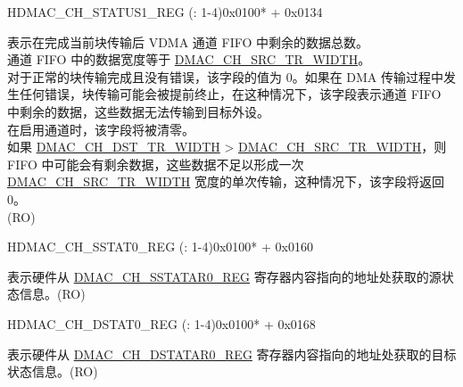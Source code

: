 \begin{register}{H}{DMAC\_CH\_STATUS1\_REG (: 1-4)}{0x0100* + 0x0134}\label{regdesc:DMACCHNSTATUS1REG}
%
%
\regnewline%
\begin{regdesc}\begin{reglist}
\label{fielddesc:DMACCHNDATALEFTINFIFO}\item [DMAC\_CH\regindex{n}\_DATA\_LEFT\_IN\_FIFO] 
表示在完成当前块传输后 VDMA 通道 FIFO 中剩余的数据总数。 \\
通道 FIFO 中的数据宽度等于 \hyperref[fielddesc:DMACCHNSRCTRWIDTH]{DMAC\_CH\_SRC\_TR\_WIDTH}。 \\
对于正常的块传输完成且没有错误，该字段的值为 0。如果在 DMA 传输过程中发生任何错误，块传输可能会被提前终止，在这种情况下，该字段表示通道 FIFO 中剩余的数据，这些数据无法传输到目标外设。\\
在启用通道时，该字段将被清零。\\
如果 \hyperref[fielddesc:DMACCHNDSTTRWIDTH]{DMAC\_CH\_DST\_TR\_WIDTH} > \hyperref[fielddesc:DMACCHNSRCTRWIDTH]{DMAC\_CH\_SRC\_TR\_WIDTH}，则 FIFO 中可能会有剩余数据，这些数据不足以形成一次 \hyperref[fielddesc:DMACCHNSRCTRWIDTH]{DMAC\_CH\_SRC\_TR\_WIDTH} 宽度的单次传输，这种情况下，该字段将返回 0。\\
(RO)
\end{reglist}\end{regdesc}
\end{register}


\begin{register}{H}{DMAC\_CH\_SSTAT0\_REG (: 1-4)}{0x0100* + 0x0160}\label{regdesc:DMACCHNSSTAT0REG}
%
\regnewline%
\begin{regdesc}\begin{reglist}
\label{fielddesc:DMACCHNSSTAT}\item [DMAC\_CH\regindex{n}\_SSTAT] 表示硬件从 \hyperref[regdesc:DMACCHNSSTATAR0REG]{DMAC\_CH\_SSTATAR0\_REG} 寄存器内容指向的地址处获取的源状态信息。(RO)
\end{reglist}\end{regdesc}
\end{register}


\begin{register}{H}{DMAC\_CH\_DSTAT0\_REG (: 1-4)}{0x0100* + 0x0168}\label{regdesc:DMACCHNDSTAT0REG}
%
\regnewline%
\begin{regdesc}\begin{reglist}
\label{fielddesc:DMACCHNDSTAT}\item [DMAC\_CH\regindex{n}\_DSTAT] 表示硬件从 \hyperref[regdesc:DMACCHNDSTATAR0REG]{DMAC\_CH\_DSTATAR0\_REG} 寄存器内容指向的地址处获取的目标状态信息。(RO)
\end{reglist}\end{regdesc}
\end{register}


